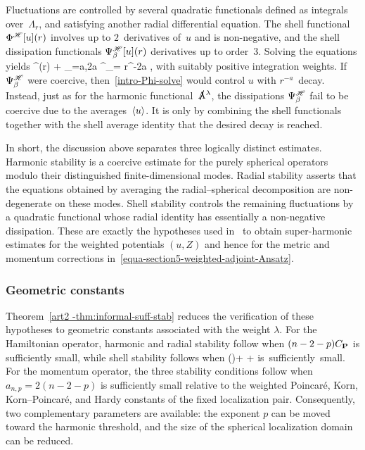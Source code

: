 \documentclass[11pt]{article}
\numberwithin{table}{section}
\numberwithin{equation}{section}
\numberwithin{table}{section}
\numberwithin{figure}{section}
\begin{document}
Fluctuations are controlled by several quadratic functionals defined as integrals over~$\Lambda_r$, and satisfying another radial differential equation.  The shell functional $\Phi^{\mathscr{H}}[u](r)$ involves up to $2$~derivatives of~$u$ and is non-negative, and the shell dissipation functionals $\Psi^{\mathscr{H}}_\beta[u](r)$ derivatives up to order~$3$.
Solving the equations yields
\Phi^\notreH[u](r) + \sum_{\beta=a,2a}  \Psi^\notreH_\beta[u] = \Cstar r^{-2a} ,
\ee
with suitably positive integration weights.  If $\Psi^{\mathscr{H}}_\beta$ were coercive, then~\eqref{intro-Phi-solve} would control $u$ with $r^{-a}$~decay.  Instead, just as for the harmonic functional~$\ssrmA^\lambda$, the dissipations $\Psi^{\mathscr{H}}_\beta$ fail to be coercive due to the averages~$\langle u\rangle$.
It is only by combining the shell functionals together with the shell average identity that the desired decay is reached.

In short, the discussion above separates three logically distinct estimates.  Harmonic stability is a coercive estimate for the purely spherical operators modulo their distinguished finite-dimensional modes.  Radial stability asserts that the equations obtained by averaging the radial--spherical decomposition are non-degenerate on these modes.  Shell stability controls the remaining fluctuations by a quadratic functional whose radial identity has essentially a non-negative dissipation.
 These are exactly the hypotheses used in~\cite{LL-optimal-main} to obtain super-harmonic estimates for the weighted potentials $(u,Z)$ and hence for the metric and momentum corrections in~\eqref{equa-section5-weighted-adjoint-Ansatz}.

\subsubsection{Geometric constants}

Theorem~\ref{art2 -thm:informal-suff-stab} reduces the verification of these hypotheses to geometric constants associated with the weight $\lambda$.  For the Hamiltonian operator, harmonic and radial stability follow when $(n- 2 -p)C_{\textnormal{\textbf{P}}}$ is sufficiently small, while shell stability follows when
\diam(\Lambda)+\CPoin
+\CPoinTwo
\quad\hbox{is sufficiently small}.
\ee
For the momentum operator, the three stability conditions follow when $a_{n,p}=2(n- 2 -p)$ is sufficiently small relative to the weighted Poincar\'e, Korn, Korn--Poincar\'e, and Hardy constants of the fixed localization pair.  Consequently, two complementary parameters are available: the exponent $p$ can be moved toward the harmonic threshold, and the size of the spherical localization domain can be reduced.
\end{document}
